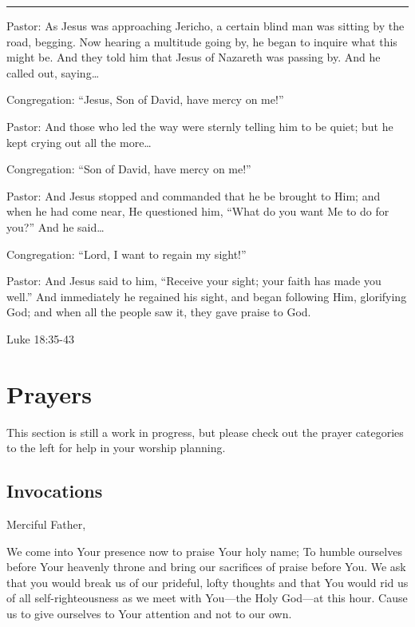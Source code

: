 \documentclass[]{book}
\begin{document}
\begin{center}\rule{0.5\linewidth}{\linethickness}\end{center}

Pastor: As Jesus was approaching Jericho, a certain blind man was sitting by the road, begging. Now hearing a multitude going by, he began to inquire what this might be. And they told him that Jesus of Nazareth was passing by. And he called out, saying\ldots{}

Congregation: ``Jesus, Son of David, have mercy on me!''

Pastor: And those who led the way were sternly telling him to be quiet; but he kept crying out all the more\ldots{}

Congregation: ``Son of David, have mercy on me!''

Pastor: And Jesus stopped and commanded that he be brought to Him; and when he had come near, He questioned him, ``What do you want Me to do for you?'' And he said\ldots{}

Congregation: ``Lord, I want to regain my sight!''

Pastor: And Jesus said to him, ``Receive your sight; your faith has made you well.'' And immediately he regained his sight, and began following Him, glorifying God; and when all the people saw it, they gave praise to God.

Luke 18:35-43 \textbar{}

\hypertarget{prayers}{%
\chapter{Prayers}\label{prayers}}

This section is still a work in progress, but please check out the prayer categories to the left for help in your worship planning.

\hypertarget{invocations}{%
\section{Invocations}\label{invocations}}

Merciful Father,

We come into Your presence now to praise Your holy name; To humble ourselves before Your heavenly throne and bring our sacrifices of praise before You. We ask that you would break us of our prideful, lofty thoughts and that You would rid us of all self-righteousness as we meet with You---the Holy God---at this hour. Cause us to give ourselves to Your attention and not to our own.
\end{document}

